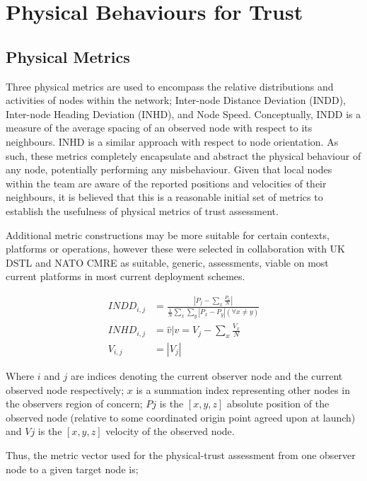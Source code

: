 \section{Physical Behaviours for Trust}\label{sec:physbev}

\subsection{Physical Metrics}

Three physical metrics are used to encompass the relative distributions and activities of nodes within the network; Inter-node Distance Deviation (INDD), Inter-node Heading Deviation (INHD), and Node Speed. 
Conceptually, INDD is a measure of the average spacing of an observed node with respect to its neighbours. 
INHD is a similar approach with respect to node orientation.
As such, these metrics completely encapsulate and abstract the physical behaviour of any node, potentially performing any misbehaviour.
Given that local nodes within the team are aware of the reported positions and velocities of their neighbours, it is believed that this is a reasonable initial set of metrics to establish the usefulness of physical metrics of trust assessment.

Additional metric constructions may be more suitable for certain contexts, platforms or operations, however these were selected in collaboration with UK DSTL and NATO CMRE as suitable, generic, assessments, viable on most current platforms in most current deployment schemes.

\begin{align}
  INDD_{i,j} &= \frac{|P_j - \sum_x \frac{P_x}{N}|}{\frac{1}{N}\sum_x \sum_y{|P_x - P_y| (\forall x \neq y)}}\\
  INHD_{i,j} &= \hat{v} \vert v= V_j - \sum_x{\frac{V_x}{N}}\\
  V_{i,j} &= |V_j|
\end{align}

Where $i$ and $j$ are indices denoting the current observer node and the current observed node respectively; $x$ is a summation index representing other nodes in the observers region of concern; $P{j}$ is the $[x,y,z]$ absolute position of the observed node (relative to some coordinated origin point agreed upon at launch) and $V{j}$ is the $[x,y,z]$ velocity of the observed node.

Thus, the metric vector used for the physical-trust assessment from one observer node to a given target node is;

